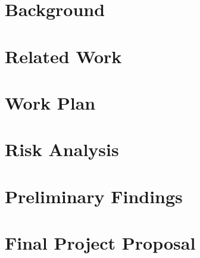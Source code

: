 \documentclass{article}
\begin{document}

\section{Background} %
\label{sec:background}







\section{Related Work} %
\label{sec:related_work}



\section{Work Plan} %
\label{sec:work_plan}


\section{Risk Analysis} %
\label{sec:risk_analysis}


\section{Preliminary Findings} %
\label{sec:prelim}





\section{Final Project Proposal} %
\label{sec:proposal}

\end{document}
